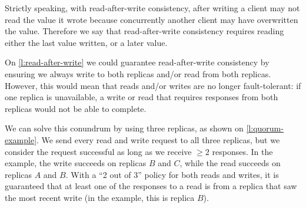 Strictly speaking, with read-after-write consistency, after writing a client may not read the value it wrote because concurrently another client may have overwritten the value.
Therefore we say that read-after-write consistency requires reading either the last value written, or a later value.

On \autoref{l:read-after-write} we could guarantee read-after-write consistency by ensuring we always write to both replicas and/or read from both replicas.
However, this would mean that reads and/or writes are no longer fault-tolerant: if one replica is unavailable, a write or read that requires responses from both replicas would not be able to complete.

We can solve this conundrum by using three replicas, as shown on \autoref{l:quorum-example}.
We send every read and write request to all three replicas, but we consider the request successful as long as we receive $\ge 2$ responses.
In the example, the write succeeds on replicas $B$ and $C$, while the read succeeds on replicas $A$ and $B$.
With a ``2 out of 3'' policy for both reads and writes, it is guaranteed that at least one of the responses to a read is from a replica that saw the most recent write (in the example, this is replica $B$).

